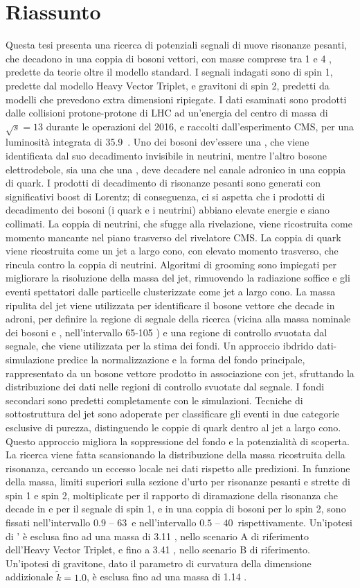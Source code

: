 \chapter*{Riassunto}
\label{ch:riassunto}

Questa tesi presenta una ricerca di potenziali segnali di nuove risonanze pesanti, che decadono in una coppia di bosoni vettori, con masse comprese tra 1 \TeV e 4 \TeV, predette da teorie oltre il modello standard. I segnali indagati sono \Wp di spin 1, predette dal modello Heavy Vector Triplet, e gravitoni di spin 2, predetti da modelli che prevedono extra dimensioni ripiegate. I dati esaminati sono prodotti dalle collisioni protone-protone di LHC ad un'energia del centro di massa di $\sqrt{s}=13$ \TeV durante le operazioni del 2016, e raccolti dall'esperimento CMS, per una luminosit\`a integrata di 35.9~\fbinv. Uno dei bosoni dev'essere una \Z, che viene identificata dal suo decadimento invisibile in neutrini, mentre l'altro bosone elettrodebole, sia una \W che una \Z, deve decadere nel canale adronico in una coppia di quark. I prodotti di decadimento di risonanze pesanti sono generati con significativi boost di Lorentz; di conseguenza, ci si aspetta che i prodotti di decadimento dei bosoni (i quark e i neutrini) abbiano elevate energie e siano collimati. La coppia di neutrini, che sfugge alla rivelazione, viene ricostruita come momento mancante nel piano trasverso del rivelatore CMS. La coppia di quark viene ricostruita come un jet a largo cono, con elevato momento trasverso, che rincula contro la coppia di neutrini. Algoritmi di grooming sono impiegati per migliorare la risoluzione della massa del jet, rimuovendo la radiazione soffice e gli eventi spettatori dalle particelle clusterizzate come jet a largo cono. La massa ripulita del jet viene utilizzata per identificare il bosone vettore che decade in adroni, per definire la regione di segnale della ricerca (vicina alla massa nominale dei bosoni \W e \Z, nell'intervallo 65-105 \GeV) e una regione di controllo svuotata dal segnale, che viene utilizzata per la stima dei fondi. Un approccio ibdrido dati-simulazione predice la normalizzazione e la forma del fondo principale, rappresentato da un bosone vettore prodotto in associazione con jet, sfruttando la distribuzione dei dati nelle regioni di controllo svuotate dal segnale. I fondi secondari sono predetti completamente con le simulazioni. Tecniche di sottostruttura del jet sono adoperate per classificare gli eventi in due categorie esclusive di purezza, distinguendo le coppie di quark dentro al jet a largo cono. Questo approccio migliora la soppressione del fondo e la potenzialit\`a di scoperta. La ricerca viene fatta scansionando la distribuzione della massa ricostruita della risonanza, cercando un eccesso locale nei dati rispetto alle predizioni. In funzione della massa, limiti superiori sulla sezione d'urto per risonanze pesanti e strette di spin 1 e spin 2, moltiplicate per il rapporto di diramazione della risonanza che decade in \Z e \W per il segnale di spin 1, e in una coppia di bosoni \Z per lo spin 2, sono fissati nell'intervallo $0.9$ -- $63$~\fb e nell'intervallo $0.5$ -- $40$~\fb rispettivamente. Un'ipotesi di \W' \`e esclusa fino ad una massa di 3.11 \TeV, nello scenario A di riferimento dell'Heavy Vector Triplet, e fino a 3.41 \TeV, nello scenario B di riferimento. Un'ipotesi di gravitone, dato il parametro di curvatura della dimensione addizionale $\tilde{k}=1.0$, \`e esclusa fino ad una massa di 1.14 \TeV.

\clearpage

